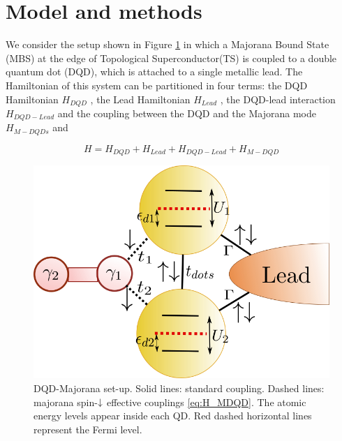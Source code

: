 \documentclass[showpacs,aps,prb,reprint,superscriptaddress]{revtex4-1}
\newcommand{\LUIS}[1]{\textcolor{blue}{\fbox{Luis} {\sl#1}}}
\begin{document}
\section{Model and methods}
\label{sec:modelmethods}





We consider the setup shown in Figure \ref{fig:GenModel} in which a Majorana Bound State (MBS) at the edge of Topological Superconductor(TS) is coupled to a double quantum dot (DQD), which is attached to a single metallic lead. The Hamiltonian of this system can be partitioned in four terms: the DQD Hamiltonian $H_{DQD}$ , the Lead Hamiltonian $H_{Lead}$ , the DQD-lead interaction  $H_{DQD-Lead}$ and the coupling between the DQD and the Majorana mode $H_{M-DQDs}$ and   

\begin{equation}
H=H_{DQD}+H_{Lead}+H_{DQD-Lead}+H_{M-DQD} 
\label{eq:Model}
\end{equation}


\begin{figure}[bt]
\begin{center}
\includegraphics[scale=0.4]{Graficos/Model.png}
\caption{ DQD-Majorana set-up. Solid lines: standard coupling. Dashed lines: majorana spin-$\downarrow$ effective couplings \eqref{eq:H_MDQD}. The atomic energy levels appear inside each QD. Red dashed horizontal lines represent the Fermi level.  
}
%
\label{fig:GenModel}
\end{center}
\end{figure}
\end{document}
